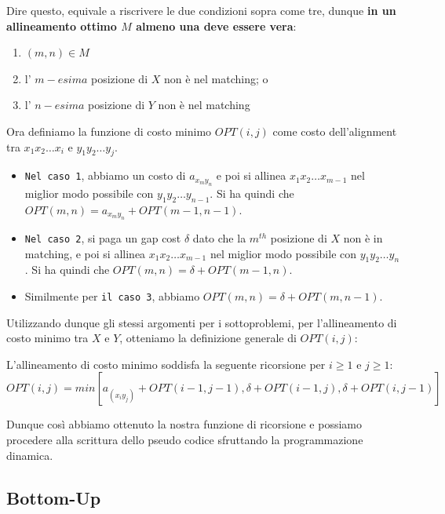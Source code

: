 Dire questo, equivale a riscrivere le due condizioni sopra come tre,
dunque \textbf{in un allineamento ottimo $M$ almeno una deve essere
	vera}:
\begin{enumerate}
	\item $(m,n) \in M$
	\item l' $m-esima$ posizione di $X$ non è nel matching; o
	\item l' $n-esima$ posizione di $Y$ non è nel matching
\end{enumerate}

Ora definiamo la funzione di costo minimo $OPT(i,j)$ come costo
dell'alignment tra $x_1 x_2 \ldots x_i$ e $y_1 y_2 \ldots y_j$.

\begin{itemize}
	\item
	      \texttt{Nel\ caso\ 1}, abbiamo un costo di $a_{x_m y_n}$ e poi si
	      allinea $x_1 x_2 \ldots x_{m-1}$ nel miglior modo possibile con
	      $y_1 y_2 \ldots y_{n-1}$. Si ha quindi che
	      $OPT(m,n) = a_{x_m y_n} + OPT(m-1,n-1)$.
	\item
	      \texttt{Nel\ caso\ 2}, si paga un gap cost $\delta$ dato che la
	      $m^{th}$ posizione di $X$ non è in matching, e poi si allinea
	      $x_1 x_2 \ldots x_{m-1}$ nel miglior modo possibile con
	      $y_1 y_2 \ldots y_{n}$. Si ha quindi che
	      $OPT(m,n) = \delta + OPT(m-1,n)$.
	\item
	      Similmente per \texttt{il\ caso\ 3}, abbiamo
	      $OPT(m,n) = \delta + OPT(m,n-1)$.
\end{itemize}

Utilizzando dunque gli stessi argomenti per i sottoproblemi, per
l'allineamento di costo minimo tra $X$ e $Y$, otteniamo la
definizione generale di $OPT(i,j)$:

\begin{myblockquote}
	L'allineamento di costo minimo soddisfa la seguente ricorsione per
	$i \geq 1$ e $j \geq 1$:\\
	$OPT(i,j) = min[a_{(x_i y_j)} + OPT(i-1, j-1), \delta + OPT(i-1, j), \delta + OPT(i, j-1)]$
\end{myblockquote}

Dunque così abbiamo ottenuto la nostra funzione di ricorsione e possiamo
procedere alla scrittura dello pseudo codice sfruttando la
programmazione dinamica.

\subsection{Bottom-Up}

